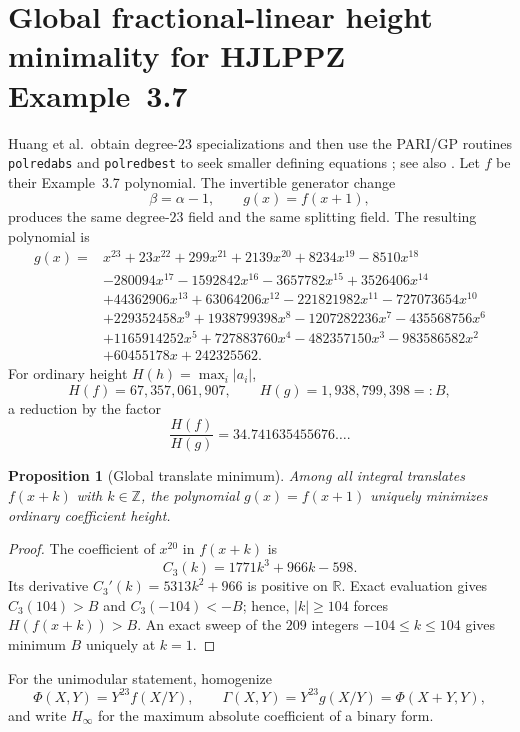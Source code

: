 \documentclass[11pt]{article}
\newtheorem{proposition}[theorem]{Proposition}
\begin{document}
\section{Global fractional-linear height minimality for HJLPPZ Example~3.7}\label{app:height}
Huang et al.\ obtain degree-$23$ specializations and then use the PARI/GP routines \texttt{polredabs} and \texttt{polredbest} to seek smaller defining equations \cite[Example~3.7]{HJLPPZ2026}; see also \cite{CohenDiaz1991,PARI2025}.  Let $f$ be their Example~3.7 polynomial.  The invertible generator change
\[
  \beta=\alpha-1,\qquad g(x)=f(x+1),
\]
produces the same degree-$23$ field and the same splitting field.  The resulting polynomial is
\[
\begin{aligned}
g(x)={}&x^{23}+23x^{22}+299x^{21}+2139x^{20}+8234x^{19}-8510x^{18}\\
&-280094x^{17}-1592842x^{16}-3657782x^{15}+3526406x^{14}\\
&+44362906x^{13}+63064206x^{12}-221821982x^{11}-727073654x^{10}\\
&+229352458x^9+1938799398x^8-1207282236x^7-435568756x^6\\
&+1165914252x^5+727883760x^4-482357150x^3-983586582x^2\\
&+60455178x+242325562.
\end{aligned}
\]
For ordinary height $H(h)=\max_i|a_i|$,
\[
 H(f)=67{,}357{,}061{,}907,\qquad H(g)=1{,}938{,}799{,}398=:B,
\]
a reduction by the factor
\[
  \frac{H(f)}{H(g)}=34.741635455676\ldots.
\]

\begin{proposition}[Global translate minimum]\label{prop:translate-global}
Among all integral translates $f(x+k)$ with $k\in\mathbb Z$, the polynomial $g(x)=f(x+1)$ uniquely minimizes ordinary coefficient height.
\end{proposition}

\begin{proof}
The coefficient of $x^{20}$ in $f(x+k)$ is
\[
 C_3(k)=1771k^3+966k-598.
\]
Its derivative $C_3'(k)=5313k^2+966$ is positive on $\mathbb R$.  Exact evaluation gives $C_3(104)>B$ and $C_3(-104)<-B$; hence, $|k|\ge104$ forces $H(f(x+k))>B$.  An exact sweep of the $209$ integers $-104\le k\le104$ gives minimum $B$ uniquely at $k=1$.
\end{proof}

For the unimodular statement, homogenize
\[
 \Phi(X,Y)=Y^{23}f(X/Y),\qquad
 \Gamma(X,Y)=Y^{23}g(X/Y)=\Phi(X+Y,Y),
\]
and write $H_\infty$ for the maximum absolute coefficient of a binary form.
\end{document}
